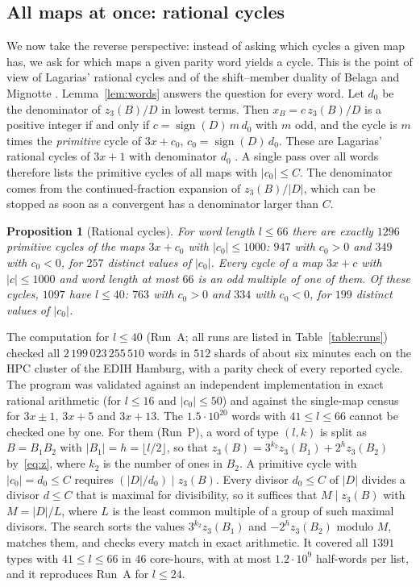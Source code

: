 \documentclass[12pt]{amsart}
\newtheorem{proposition}{Proposition}
\theoremstyle{definition}
\theoremstyle{remark}
\begin{document}
\subsection*{All maps at once: rational cycles}
We now take the reverse perspective: instead of asking which cycles a given map has, we ask for which maps a given parity word yields a cycle. This is the point of view of Lagarias' rational cycles \cite{Lagarias_1990} and of the shift--member duality of Belaga and Mignotte \cite[Section~7]{Belaga_Mignotte_DMTCS_2006}. Lemma~\ref{lem:words} answers the question for every word. Let $d_0$ be the denominator of $z_3(B)/D$ in lowest terms. Then $x_B=c\,z_3(B)/D$ is a positive integer if and only if $c=\operatorname{sign}(D)\,m\,d_0$ with $m$ odd, and the cycle is $m$ times the \emph{primitive} cycle of $3x+c_0$, $c_0=\operatorname{sign}(D)\,d_0$. These are Lagarias' rational cycles of $3x+1$ with denominator $d_0$ \cite{Lagarias_1990}. A single pass over all words therefore lists the primitive cycles of all maps with $|c_0|\le C$. The denominator comes from the continued-fraction expansion of $z_3(B)/|D|$, which can be stopped as soon as a convergent has a denominator larger than $C$.

\begin{proposition}[Rational cycles]
\label{prop:rational}
For word length $l\le66$ there are exactly $1296$ primitive cycles of the maps $3x+c_0$ with $|c_0|\le1000$: $947$ with $c_0>0$ and $349$ with $c_0<0$, for $257$ distinct values of $|c_0|$. Every cycle of a map $3x+c$ with $|c|\le1000$ and word length at most $66$ is an odd multiple of one of them. Of these cycles, $1097$ have $l\le40$: $763$ with $c_0>0$ and $334$ with $c_0<0$, for $199$ distinct values of $|c_0|$.
\end{proposition}

The computation for $l\le40$ (Run~A; all runs are listed in Table~\ref{table:runs}) checked all $2\,199\,023\,255\,510$ words in $512$ shards of about six minutes each on the HPC cluster of the EDIH Hamburg, with a parity check of every reported cycle. The program was validated against an independent implementation in exact rational arithmetic (for $l\le16$ and $|c_0|\le50$) and against the single-map census for $3x\pm1$, $3x+5$ and $3x+13$. The $1.5\cdot10^{20}$ words with $41\le l\le66$ cannot be checked one by one. For them (Run~P), a word of type $(l,k)$ is split as $B=B_1B_2$ with $|B_1|=h=\lfloor l/2\rfloor$, so that $z_3(B)=3^{k_2}z_3(B_1)+2^hz_3(B_2)$ by~\eqref{eq:z}, where $k_2$ is the number of ones in $B_2$. A primitive cycle with $|c_0|=d_0\le C$ requires $(|D|/d_0)\mid z_3(B)$. Every divisor $d_0\le C$ of $|D|$ divides a divisor $d\le C$ that is maximal for divisibility, so it suffices that $M\mid z_3(B)$ with $M=|D|/L$, where $L$ is the least common multiple of a group of such maximal divisors. The search sorts the values $3^{k_2}z_3(B_1)$ and $-2^hz_3(B_2)$ modulo $M$, matches them, and checks every match in exact arithmetic. It covered all $1391$ types with $41\le l\le66$ in $46$ core-hours, with at most $1.2\cdot10^9$ half-words per list, and it reproduces Run~A for $l\le24$.
\end{document}
